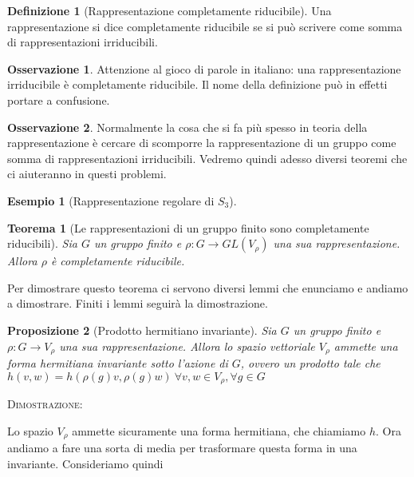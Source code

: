 \documentclass[11pt]{article}
\theoremstyle{plain}
\newtheorem{thm}{Teorema}[section]
\newtheorem{prop}[thm]{Proposizione}
\theoremstyle{definition}
\newtheorem{defn}{Definizione}[section]
\newtheorem{exmp}{Esempio}[section]
\newtheorem*{rem}{Osservazione}
\theoremstyle{remark}
\begin{document}
\begin{defn}[Rappresentazione completamente riducibile]
Una rappresentazione si dice completamente riducibile se si può scrivere come somma di rappresentazioni irriducibili.
\end{defn}


\begin{rem}
Attenzione al gioco di parole in italiano: una rappresentazione irriducibile è completamente riducibile. Il nome della definizione può in effetti portare a confusione.
\end{rem}


\begin{rem} Normalmente la cosa che si fa più spesso in teoria della rappresentazione è cercare di scomporre la rappresentazione di un gruppo come somma di rappresentazioni irriducibili. Vedremo quindi adesso diversi teoremi che ci aiuteranno in questi problemi.

\end{rem}



\begin{exmp}[Rappresentazione regolare di $S_3$]


\end{exmp}



\begin{thm}[Le rappresentazioni di un gruppo finito sono completamente riducibili]
  Sia $G$ un gruppo finito e $\rho: G \to GL(V_\rho)$ una sua rappresentazione. Allora $\rho$ è completamente riducibile.
  \label{thm:gruppo finito completamente riducibile}
\end{thm}
Per dimostrare questo teorema ci servono diversi lemmi che enunciamo e andiamo a dimostrare. Finiti i lemmi seguirà la dimostrazione.


\begin{prop}[Prodotto hermitiano invariante] Sia $G$ un gruppo finito e $\rho: G \to V_\rho$ una sua rappresentazione. Allora lo spazio vettoriale $V_\rho$ ammette una forma hermitiana invariante sotto l'azione di $G$, ovvero un prodotto tale che $h(v,w) = h(\rho(g) v, \rho(g) w) \ \forall v,w\in V_\rho, \forall g \in G$
\label{thm:esistenza hermitiana}
\end{prop}

\textsc{Dimostrazione:}

Lo spazio $V_\rho$ ammette sicuramente una forma hermitiana, che chiamiamo $h$. Ora andiamo a fare una sorta di media per trasformare questa forma in una invariante. Consideriamo quindi
\end{document}
